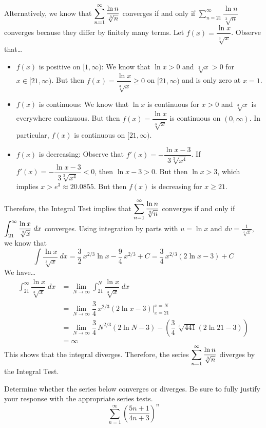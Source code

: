 \documentclass[12pt,letterpaper]{exam}
\begin{document}
\begin{questions}
{Alternatively, we know that $\displaystyle\sum_{n=1}^\infty \dfrac{\ln n}{\sqrt[3]{n}}$ converges if and only if $\sum_{n=21}^\infty \dfrac{\ln n}{\sqrt[3]{n}}$ converges because they differ by finitely many terms. Let $f(x)= \dfrac{\ln x}{\sqrt[3]{x}}$. Observe that\dots
	\begin{itemize}
	\item $f(x)$ is positive on $[1, \infty)$: We know that $\ln x > 0$ and $\sqrt[3]{x} > 0$ for $x \in [21, \infty)$. But then $f(x)= \dfrac{\ln x}{\sqrt[3]{x}} \geq 0$ on $[21, \infty)$ and is only zero at $x= 1$. 
	\item $f(x)$ is continuous: We know that $\ln x$ is continuous for $x > 0$ and $\sqrt[3]{x}$ is everywhere continuous. But then $f(x)= \dfrac{\ln x}{\sqrt[3]{x}}$ is continuous on $(0, \infty)$. In particular, $f(x)$ is continuous on $[21, \infty)$. 
	\item $f(x)$ is decreasing: Observe that $f'(x)= -\dfrac{\ln x - 3}{3 \sqrt[3]{x^4}}$. If $f'(x)= -\dfrac{\ln x - 3}{3 \sqrt[3]{x^4}} < 0$, then $\ln x - 3 > 0$. But then $\ln x > 3$, which implies $x > e^3 \approx 20.0855$. But then $f(x)$ is decreasing for $x \geq 21$.
	\end{itemize}
Therefore, the Integral Test implies that $\displaystyle\sum_{n=1}^\infty \dfrac{\ln n}{\sqrt[3]{n}}$ converges if and only if $\displaystyle\int_{21}^\infty \dfrac{\ln x}{\sqrt[3]{x}} \;dx$ converges. Using integration by parts with $u= \ln x$ and $dv= \frac{1}{\sqrt[3]{x}}$, we know that
	\[
	\int \dfrac{\ln x}{\sqrt[3]{x}} \;dx= \dfrac{3}{2}\, x^{2/3} \ln x - \dfrac{9}{4} \, x^{2/3} + C= \dfrac{3}{4}\, x^{2/3} ( 2 \ln x - 3) + C
	\]
We have\dots
	\[
	\begin{aligned}
	\int_{21}^\infty \dfrac{\ln x}{\sqrt[3]{x}} \;dx&= \lim_{N \to \infty} \int_{21}^N \dfrac{\ln x}{\sqrt[3]{x}} \;dx \\
	&= \lim_{N \to \infty} \dfrac{3}{4}\, x^{2/3} ( 2 \ln x - 3) \bigg|_{x=21}^{x=N} \\
	&= \lim_{N \to \infty} \dfrac{3}{4}\, N^{2/3} ( 2 \ln N - 3) - \left( \dfrac{3}{4} \, \sqrt[3]{441} (2 \ln 21 - 3) \right) \\
	&= \infty
	\end{aligned}
	\]
This shows that the integral diverges. Therefore, the series $\displaystyle\sum_{n=1}^\infty \dfrac{\ln n}{\sqrt[3]{n}}$ diverges by the Integral Test.} 



\newpage
\question[10] Determine whether the series below converges or diverges. Be sure to fully justify your response with the appropriate series tests.
	\[
	\sum_{n=1}^\infty \left( \dfrac{5n + 1}{4n + 3} \right)^n
	\] \pspace


\end{questions}
\end{document}
